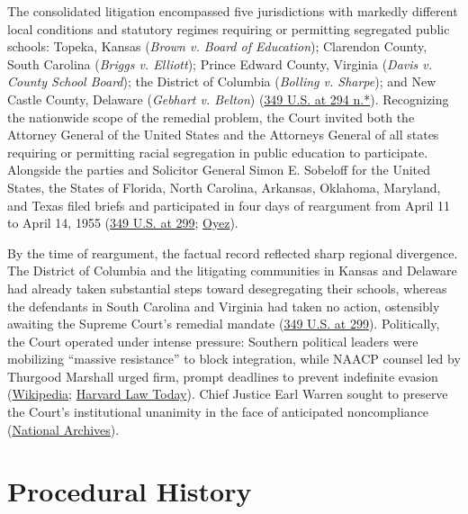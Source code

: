 \documentclass[12pt]{article}
\begin{document}
The consolidated litigation encompassed five jurisdictions with markedly different local conditions and statutory regimes requiring or permitting segregated public schools: Topeka, Kansas (\textit{Brown v. Board of Education}); Clarendon County, South Carolina (\textit{Briggs v. Elliott}); Prince Edward County, Virginia (\textit{Davis v. County School Board}); the District of Columbia (\textit{Bolling v. Sharpe}); and New Castle County, Delaware (\textit{Gebhart v. Belton}) (\href{https://supreme.justia.com/cases/federal/us/349/294/}{349 U.S. at 294 n.*}). Recognizing the nationwide scope of the remedial problem, the Court invited both the Attorney General of the United States and the Attorneys General of all states requiring or permitting racial segregation in public education to participate. Alongside the parties and Solicitor General Simon E. Sobeloff for the United States, the States of Florida, North Carolina, Arkansas, Oklahoma, Maryland, and Texas filed briefs and participated in four days of reargument from April 11 to April 14, 1955 (\href{https://supreme.justia.com/cases/federal/us/349/294/}{349 U.S. at 299}; \href{https://www.oyez.org/cases/1940-1955/349us294}{Oyez}).

By the time of reargument, the factual record reflected sharp regional divergence. The District of Columbia and the litigating communities in Kansas and Delaware had already taken substantial steps toward desegregating their schools, whereas the defendants in South Carolina and Virginia had taken no action, ostensibly awaiting the Supreme Court's remedial mandate (\href{https://supreme.justia.com/cases/federal/us/349/294/}{349 U.S. at 299}). Politically, the Court operated under intense pressure: Southern political leaders were mobilizing ``massive resistance'' to block integration, while NAACP counsel led by Thurgood Marshall urged firm, prompt deadlines to prevent indefinite evasion (\href{https://en.wikipedia.org/wiki/Brown_v._Board_of_Education}{Wikipedia}; \href{https://hls.harvard.edu/today/q-a-professor-ogletree-on-the-brown-v-board-decision/}{Harvard Law Today}). Chief Justice Earl Warren sought to preserve the Court's institutional unanimity in the face of anticipated noncompliance (\href{https://www.archives.gov/education/lessons/brown-v-board}{National Archives}).

\section{Procedural History}
\end{document}
